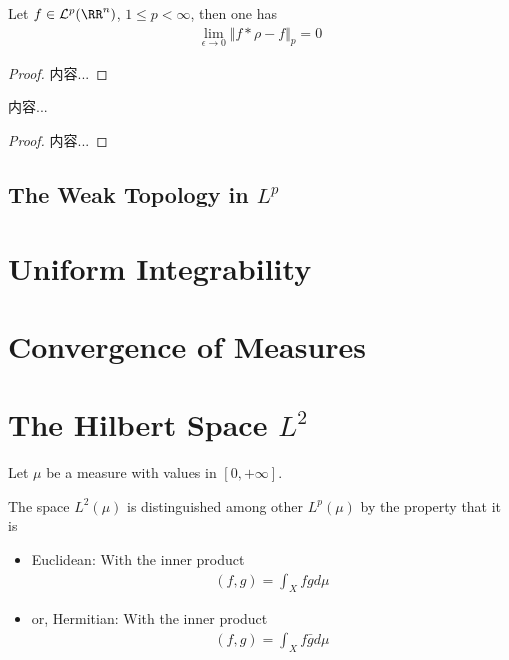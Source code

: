 \documentclass[Total.tex]{subfiles}
\begin{document}
		\begin{theorem}
			Let $f\in \mathcal{L}^p(\RR^n)$, $1\leq p<\infty$, then one has
			\begin{gather*}
				\lim_{\epsilon\rightarrow 0}\Vert f*\rho-f\Vert_p=0
			\end{gather*}
		\end{theorem}
		\begin{proof}
			内容...
		\end{proof}
		
		\begin{corollary}
			内容...
		\end{corollary}
		\begin{proof}
			内容...
		\end{proof}
	\subsection{The Weak Topology in $L^p$}
	
	\section{Uniform Integrability}
	\section{Convergence of Measures}
	
	\section{The Hilbert Space $L^2$}
		\begin{Def}
			Let $\mu$ be a measure with values in $[0,+\infty]$.
			
			The space $L^2(\mu)$ is distinguished among other $L^p(\mu)$ by the property that it is 
			\begin{itemize}
				\item Euclidean: With the inner product
				\begin{gather*}
					(f,g)=\int_X fgd\mu
				\end{gather*}
				
				\item or, Hermitian: With the inner product
				\begin{gather*}
					(f,g)=\int_X f\bar{g}d\mu
				\end{gather*}
			\end{itemize}
		\end{Def}
		
\end{document}
